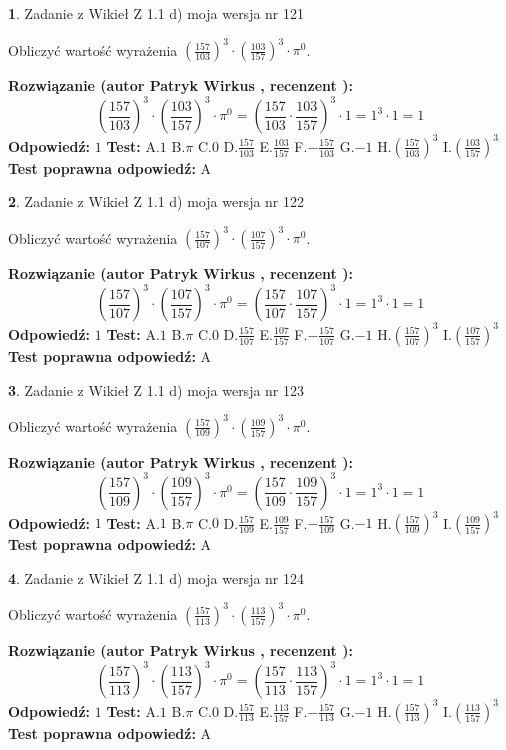 \documentclass[12pt, a4paper]{article}
\theoremstyle{definition} %
\newtheorem{zad}{}
\newcommand{\zadStart}[1]{\begin{zad}#1\newline}
\newcommand{\zadStop}{\end{zad}}
\newcommand{\rozwStart}[2]{\noindent \textbf{Rozwiązanie (autor #1 , recenzent #2): }\newline}
\newcommand{\rozwStop}{\newline}
\newcommand{\odpStart}{\noindent \textbf{Odpowiedź:}\newline}
\newcommand{\odpStop}{\newline}
\newcommand{\testStart}{\noindent \textbf{Test:}\newline}
\newcommand{\testStop}{\newline}
\newcommand{\kluczStart}{\noindent \textbf{Test poprawna odpowiedź:}\newline}
\newcommand{\kluczStop}{\newline}
\begin{document}
\zadStart{Zadanie z Wikieł Z 1.1 d) moja wersja nr 121}

Obliczyć wartość wyrażenia $(\frac{157}{103})^{3} \cdot (\frac{103}{157})^{3} \cdot \pi^{0}$.
\zadStop
\rozwStart{Patryk Wirkus}{}
$$(\frac{157}{103})^{3} \cdot (\frac{103}{157})^{3} \cdot \pi^{0} = (\frac{157}{103} \cdot \frac{103}{157})^{3} \cdot 1 = 1^{3} \cdot 1 = 1$$
\rozwStop
\odpStart
$1$
\odpStop
\testStart
A.$1$ B.$\pi$ C.$0$ D.$\frac{157}{103}$ E.$\frac{103}{157}$
F.$-\frac{157}{103}$ G.$-1$
H.$(\frac{157}{103})^{3}$
I.$(\frac{103}{157})^{3}$
\testStop
\kluczStart
A
\kluczStop



\zadStart{Zadanie z Wikieł Z 1.1 d) moja wersja nr 122}

Obliczyć wartość wyrażenia $(\frac{157}{107})^{3} \cdot (\frac{107}{157})^{3} \cdot \pi^{0}$.
\zadStop
\rozwStart{Patryk Wirkus}{}
$$(\frac{157}{107})^{3} \cdot (\frac{107}{157})^{3} \cdot \pi^{0} = (\frac{157}{107} \cdot \frac{107}{157})^{3} \cdot 1 = 1^{3} \cdot 1 = 1$$
\rozwStop
\odpStart
$1$
\odpStop
\testStart
A.$1$ B.$\pi$ C.$0$ D.$\frac{157}{107}$ E.$\frac{107}{157}$
F.$-\frac{157}{107}$ G.$-1$
H.$(\frac{157}{107})^{3}$
I.$(\frac{107}{157})^{3}$
\testStop
\kluczStart
A
\kluczStop



\zadStart{Zadanie z Wikieł Z 1.1 d) moja wersja nr 123}

Obliczyć wartość wyrażenia $(\frac{157}{109})^{3} \cdot (\frac{109}{157})^{3} \cdot \pi^{0}$.
\zadStop
\rozwStart{Patryk Wirkus}{}
$$(\frac{157}{109})^{3} \cdot (\frac{109}{157})^{3} \cdot \pi^{0} = (\frac{157}{109} \cdot \frac{109}{157})^{3} \cdot 1 = 1^{3} \cdot 1 = 1$$
\rozwStop
\odpStart
$1$
\odpStop
\testStart
A.$1$ B.$\pi$ C.$0$ D.$\frac{157}{109}$ E.$\frac{109}{157}$
F.$-\frac{157}{109}$ G.$-1$
H.$(\frac{157}{109})^{3}$
I.$(\frac{109}{157})^{3}$
\testStop
\kluczStart
A
\kluczStop



\zadStart{Zadanie z Wikieł Z 1.1 d) moja wersja nr 124}

Obliczyć wartość wyrażenia $(\frac{157}{113})^{3} \cdot (\frac{113}{157})^{3} \cdot \pi^{0}$.
\zadStop
\rozwStart{Patryk Wirkus}{}
$$(\frac{157}{113})^{3} \cdot (\frac{113}{157})^{3} \cdot \pi^{0} = (\frac{157}{113} \cdot \frac{113}{157})^{3} \cdot 1 = 1^{3} \cdot 1 = 1$$
\rozwStop
\odpStart
$1$
\odpStop
\testStart
A.$1$ B.$\pi$ C.$0$ D.$\frac{157}{113}$ E.$\frac{113}{157}$
F.$-\frac{157}{113}$ G.$-1$
H.$(\frac{157}{113})^{3}$
I.$(\frac{113}{157})^{3}$
\testStop
\kluczStart
A
\kluczStop
\end{document}
